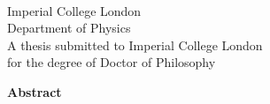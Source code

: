 \begin{titlepage}
\begin{center}

\begin{centering}
\Large \@author \\
\vspace{0.5cm}
\Large Imperial College London \\
\Large Department of Physics \\
\vspace{8cm}
\small A thesis submitted to Imperial College London \\
\small for the degree of Doctor of Philosophy
\end{centering}

\end{center}

\newpage

\begin{center}
\Large \textbf{Abstract}
\vspace{0.5cm}
\end{center}


\end{titlepage}
